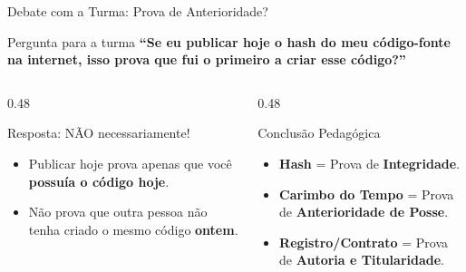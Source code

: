 \documentclass[9pt]{beamer}
\begin{document}
\begin{frame}{Debate com a Turma: Prova de Anterioridade?}
  \begin{alertblock}{Pergunta para a turma}
    \large
    \textbf{“Se eu publicar hoje o hash do meu código-fonte na internet, isso prova que fui o primeiro a criar esse código?”}
  \end{alertblock}

  \vspace{0.3cm}

  \begin{columns}[T]
    \begin{column}{0.48\textwidth}
      \begin{block}{Resposta: NÃO necessariamente!}
        \small
        \begin{itemize}
          \item Publicar hoje prova apenas que você \textbf{possuía o código hoje}.
          \item Não prova que outra pessoa não tenha criado o mesmo código \textbf{ontem}.
        \end{itemize}
      \end{block}
    \end{column}

    \begin{column}{0.48\textwidth}
      \begin{block}{Conclusão Pedagógica}
        \small
        \begin{itemize}
          \item \textbf{Hash} = Prova de \textbf{Integridade}.
          \item \textbf{Carimbo do Tempo} = Prova de \textbf{Anterioridade de Posse}.
          \item \textbf{Registro/Contrato} = Prova de \textbf{Autoria e Titularidade}.
        \end{itemize}
      \end{block}
    \end{column}
  \end{columns}
\end{frame}
\end{document}
